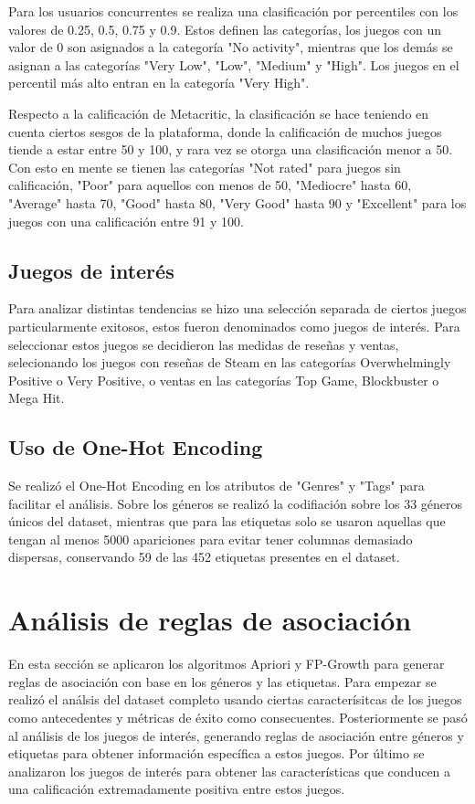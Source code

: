 \documentclass[conference]{IEEEtran}
\begin{document}
Para los usuarios concurrentes se realiza una clasificación por percentiles con los valores de 0.25, 0.5, 0.75 y 0.9. Estos definen las categorías, los juegos con un valor de 0 son asignados a la categoría "No activity", mientras que los demás se asignan a las categorías "Very Low", "Low", "Medium" y "High". Los juegos en el percentil más alto entran en la categoría "Very High".

Respecto a la calificación de Metacritic, la clasificación se hace teniendo en cuenta ciertos sesgos de la plataforma, donde la calificación de muchos juegos tiende a estar entre 50 y 100, y rara vez se otorga una clasificación menor a 50. Con esto en mente se tienen las categorías "Not rated" para juegos sin calificación, "Poor" para aquellos con menos de 50, "Mediocre" hasta 60, "Average" hasta 70, "Good" hasta 80, "Very Good" hasta 90 y "Excellent" para los juegos con una calificación entre 91 y 100.

\subsection{Juegos de interés}
Para analizar distintas tendencias se hizo una selección separada de ciertos juegos particularmente exitosos, estos fueron denominados como juegos de interés. Para seleccionar estos juegos se decidieron las medidas de reseñas y ventas, selecionando los juegos con reseñas de Steam en las categorías Overwhelmingly Positive o Very Positive, o ventas en las categorías Top Game, Blockbuster o Mega Hit.

\subsection{Uso de One-Hot Encoding}
Se realizó el One-Hot Encoding en los atributos de "Genres" y "Tags" para facilitar el análisis. Sobre los géneros se realizó la codifiación sobre los 33 géneros únicos del dataset, mientras que para las etiquetas solo se usaron aquellas que tengan al menos 5000 apariciones para evitar tener columnas demasiado dispersas, conservando 59 de las 452 etiquetas presentes en el dataset.

\section{Análisis de reglas de asociación}
En esta sección se aplicaron los algoritmos Apriori y FP-Growth para generar reglas de asociación con base en los géneros y las etiquetas. Para empezar se realizó el análsis del dataset completo usando ciertas caracterísitcas de los juegos como antecedentes y métricas de éxito como consecuentes. Posteriormente se pasó al análisis de los juegos de interés, generando reglas de asociación entre géneros y etiquetas para obtener información específica a estos juegos. Por último se analizaron los juegos de interés para obtener las características que conducen a una calificación extremadamente positiva entre estos juegos.
\end{document}
